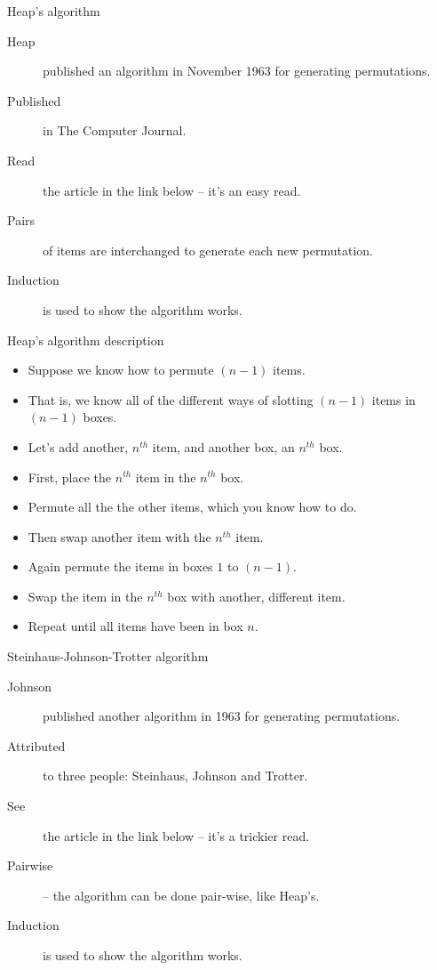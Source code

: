 \begin{frame}[fragile]{Heap's algorithm}
	\begin{description}
		\item[Heap] published an algorithm in November 1963 for generating permutations.
		\item[Published] in The Computer Journal.
		\item[Read] the article in the link below -- it's an easy read.
		\item[Pairs] of items are interchanged to generate each new permutation.
		\item[Induction] is used to show the algorithm works.
	\end{description}
\end{frame}

\begin{frame}[fragile]{Heap's algorithm description}
	\begin{itemize}
		\item Suppose we know how to permute $(n-1)$ items.
		\item That is, we know all of the different ways of slotting $(n-1)$ items in $(n-1)$ boxes.
		\item Let's add another, $n^{th}$ item, and another box, an $n^{th}$ box.
		\item First, place the $n^{th}$ item in the $n^{th}$ box.
		\item Permute all the the other items, which you know how to do.
		\item Then swap another item with the $n^{th}$ item.
		\item Again permute the items in boxes $1$ to $(n-1)$.
		\item Swap the item in the $n^{th}$ box with another, different item.
		\item Repeat until all items have been in box $n$.
	\end{itemize}
\end{frame}

\begin{frame}{Steinhaus-Johnson-Trotter algorithm}
	\begin{description}
		\item[Johnson] published another algorithm in 1963 for generating permutations.
		\item[Attributed] to three people: Steinhaus, Johnson and Trotter.
		\item[See] the article in the link below -- it's a trickier read.
		\item[Pairwise] -- the algorithm can be done pair-wise, like Heap's.
		\item[Induction] is used to show the algorithm works.
	\end{description}
\end{frame}

